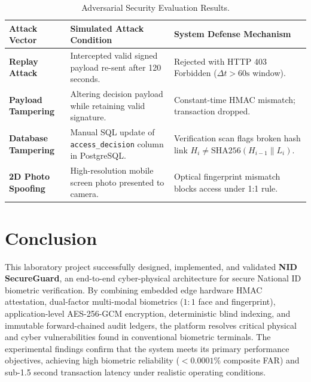 \documentclass[11pt,a4paper]{article}
\begin{document}
\begin{table}[htbp]
\centering
\caption{Adversarial Security Evaluation Results.}
\label{tab:security_eval}
\begin{tabularx}{\textwidth}{p{3.8cm} X p{4.6cm}}
\toprule
\textbf{Attack Vector} & \textbf{Simulated Attack Condition} & \textbf{System Defense Mechanism} \\
\midrule
\textbf{Replay Attack} & Intercepted valid signed payload re-sent after 120 seconds. & Rejected with HTTP 403 Forbidden ($\Delta t > 60\text{s}$ window). \\
\addlinespace
\textbf{Payload Tampering} & Altering decision payload while retaining valid signature. & Constant-time HMAC mismatch; transaction dropped. \\
\addlinespace
\textbf{Database Tampering} & Manual SQL update of \texttt{access\_decision} column in PostgreSQL. & Verification scan flags broken hash link $H_i \ne \text{SHA256}(H_{i-1} \parallel L_i)$. \\
\addlinespace
\textbf{2D Photo Spoofing} & High-resolution mobile screen photo presented to camera. & Optical fingerprint mismatch blocks access under 1:1 rule. \\
\bottomrule
\end{tabularx}
\end{table}

\section{Conclusion}
This laboratory project successfully designed, implemented, and validated \textbf{NID SecureGuard}, an end-to-end cyber-physical architecture for secure National ID biometric verification. By combining embedded edge hardware HMAC attestation, dual-factor multi-modal biometrics ($1:1$ face and fingerprint), application-level AES-256-GCM encryption, deterministic blind indexing, and immutable forward-chained audit ledgers, the platform resolves critical physical and cyber vulnerabilities found in conventional biometric terminals. The experimental findings confirm that the system meets its primary performance objectives, achieving high biometric reliability ($< 0.0001\%$ composite FAR) and sub-1.5 second transaction latency under realistic operating conditions.
\end{document}
